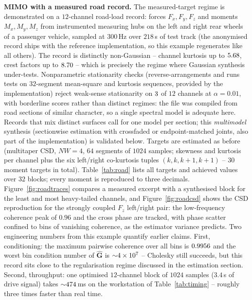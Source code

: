 \documentclass[10pt,a4paper]{article}
\numberwithin{equation}{section}
\begin{document}
\textbf{MIMO with a measured road record.} The measured-target regime is demonstrated on a $12$-channel road-load record: forces $F_x, F_y, F_z$ and moments $M_x, M_y, M_z$ from instrumented measuring hubs on the left and right rear wheels of a passenger vehicle, sampled at $300\,$Hz over $218\,$s of test track (the anonymised record ships with the reference implementation, so this example regenerates like all others). The record is distinctly non-Gaussian -- channel kurtosis up to $5.68$, crest factors up to $8.70$ -- which is precisely the regime where Gaussian synthesis under-tests. Nonparametric stationarity checks (reverse-arrangements and runs tests on $32$-segment mean-square and kurtosis sequences, provided by the implementation) reject weak-sense stationarity on $3$ of $12$ channels at $\alpha = 0.01$, with borderline scores rather than distinct regimes: the file was compiled from road sections of similar character, so a single spectral model is adequate here. Records that mix distinct surfaces call for one model per section; this \emph{multimodel} synthesis (sectionwise estimation with crossfaded or endpoint-matched joints, also part of the implementation) is validated below. Targets are estimated as before (multitaper CSD, $NW = 4$, $64$ segments of $1024$ samples; skewness and kurtosis per channel plus the six left/right co-kurtosis tuples $(k, k, k{+}1, k{+}1)$ -- $30$ moment targets in total). Table~\ref{tab:road} lists all targets and achieved values over $32$ blocks; every moment is reproduced to three decimals. Figure~\ref{fig:roadtraces} compares a measured excerpt with a synthesised block for the least and most heavy-tailed channels, and Figure~\ref{fig:roadcsd} shows the CSD reproduction for the strongly coupled $F_z$ left/right pair: the low-frequency coherence peak of $0.96$ and the cross phase are tracked, with phase scatter confined to bins of vanishing coherence, as the estimator variance predicts. Two engineering numbers from this example quantify earlier claims. First, conditioning: the maximum pairwise coherence over all bins is $0.9956$ and the worst bin condition number of $\hat{\mathbf{G}}$ is ${\sim}4 \times 10^{7}$ -- Cholesky still succeeds, but this record sits close to the regularisation regime discussed in the estimation section. Second, throughput: one optimised $12$-channel block of $1024$ samples ($3.4\,$s of drive signal) takes ${\sim}474\,$ms on the workstation of Table~\ref{tab:timing} -- roughly three times faster than real time.
\end{document}
